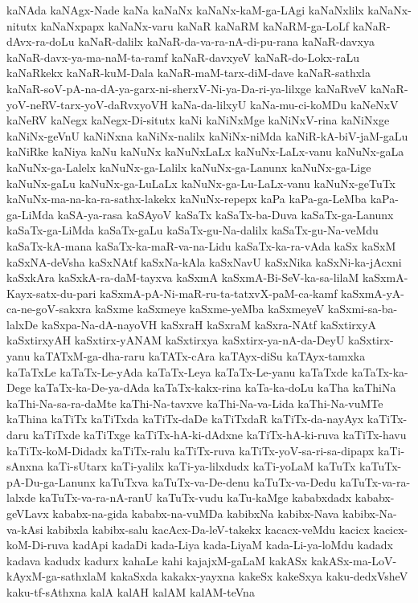 {kaNAda
kaNAgx-Nade
kaNa
kaNaNx
kaNaNx-kaM-ga-LAgi
kaNaNxlilx
kaNaNx-nitutx
kaNaNxpapx
kaNaNx-varu
kaNaR
kaNaRM
kaNaRM-ga-LoLf
kaNaR-dAvx-ra-doLu
kaNaR-dalilx
kaNaR-da-va-ra-nA-di-pu-rana
kaNaR-davxya
kaNaR-davx-ya-ma-naM-ta-ramf
kaNaR-davxyeV
kaNaR-do-Lokx-raLu
kaNaRkekx
kaNaR-kuM-Dala
kaNaR-maM-tarx-diM-dave
kaNaR-sathxla
kaNaR-soV-pA-na-dA-ya-garx-ni-sherxV-Ni-ya-Da-ri-ya-lilxge
kaNaRveV
kaNaR-yoV-neRV-tarx-yoV-daRvxyoVH
kaNa-da-lilxyU
kaNa-mu-ci-koMDu
kaNeNxV
kaNeRV
kaNegx
kaNegx-Di-situtx
kaNi
kaNiNxMge
kaNiNxV-rina
kaNiNxge
kaNiNx-geVnU
kaNiNxna
kaNiNx-nalilx
kaNiNx-niMda
kaNiR-kA-biV-jaM-gaLu
kaNiRke
kaNiya
kaNu
kaNuNx
kaNuNxLaLx
kaNuNx-LaLx-vanu
kaNuNx-gaLa
kaNuNx-ga-Lalelx
kaNuNx-ga-Lalilx
kaNuNx-ga-Lanunx
kaNuNx-ga-Lige
kaNuNx-gaLu
kaNuNx-ga-LuLaLx
kaNuNx-ga-Lu-LaLx-vanu
kaNuNx-geTuTx
kaNuNx-ma-na-ka-ra-sathx-lakekx
kaNuNx-repepx
kaPa
kaPa-ga-LeMba
kaPa-ga-LiMda
kaSA-ya-rasa
kaSAyoV
kaSaTx
kaSaTx-ba-Duva
kaSaTx-ga-Lanunx
kaSaTx-ga-LiMda
kaSaTx-gaLu
kaSaTx-gu-Na-dalilx
kaSaTx-gu-Na-veMdu
kaSaTx-kA-mana
kaSaTx-ka-maR-va-na-Lidu
kaSaTx-ka-ra-vAda
kaSx
kaSxM
kaSxNA-deVsha
kaSxNAtf
kaSxNa-kAla
kaSxNavU
kaSxNika
kaSxNi-ka-jAcxni
kaSxkAra
kaSxkA-ra-daM-tayxva
kaSxmA
kaSxmA-Bi-SeV-ka-sa-lilaM
kaSxmA-Kayx-satx-du-pari
kaSxmA-pA-Ni-maR-ru-ta-tatxvX-paM-ca-kamf
kaSxmA-yA-ca-ne-goV-sakxra
kaSxme
kaSxmeye
kaSxme-yeMba
kaSxmeyeV
kaSxmi-sa-ba-lalxDe
kaSxpa-Na-dA-nayoVH
kaSxraH
kaSxraM
kaSxra-NAtf
kaSxtirxyA
kaSxtirxyAH
kaSxtirx-yANAM
kaSxtirxya
kaSxtirx-ya-nA-da-DeyU
kaSxtirx-yanu
kaTATxM-ga-dha-raru
kaTATx-cAra
kaTAyx-diSu
kaTAyx-tamxka
kaTaTxLe
kaTaTx-Le-yAda
kaTaTx-Leya
kaTaTx-Le-yanu
kaTaTxde
kaTaTx-ka-Dege
kaTaTx-ka-De-ya-dAda
kaTaTx-kakx-rina
kaTa-ka-doLu
kaTha
kaThiNa
kaThi-Na-sa-ra-daMte
kaThi-Na-tavxve
kaThi-Na-va-Lida
kaThi-Na-vuMTe
kaThina
kaTiTx
kaTiTxda
kaTiTx-daDe
kaTiTxdaR
kaTiTx-da-nayAyx
kaTiTx-daru
kaTiTxde
kaTiTxge
kaTiTx-hA-ki-dAdxne
kaTiTx-hA-ki-ruva
kaTiTx-havu
kaTiTx-koM-Didadx
kaTiTx-ralu
kaTiTx-ruva
kaTiTx-yoV-sa-ri-sa-dipapx
kaTi-sAnxna
kaTi-sUtarx
kaTi-yalilx
kaTi-ya-lilxdudx
kaTi-yoLaM
kaTuTx
kaTuTx-pA-Du-ga-Lanunx
kaTuTxva
kaTuTx-va-De-denu
kaTuTx-va-Dedu
kaTuTx-va-ra-lalxde
kaTuTx-va-ra-nA-ranU
kaTuTx-vudu
kaTu-kaMge
kababxdadx
kababx-geVLavx
kababx-na-gida
kababx-na-vuMDa
kabibxNa
kabibx-Nava
kabibx-Na-va-kAsi
kabibxla
kabibx-salu
kacAcx-Da-leV-takekx
kacacx-veMdu
kacicx
kacicx-koM-Di-ruva
kadApi
kadaDi
kada-Liya
kada-LiyaM
kada-Li-ya-loMdu
kadadx
kadava
kadudx
kadurx
kahaLe
kahi
kajajxM-gaLaM
kakASx
kakASx-ma-LoV-kAyxM-ga-sathxlaM
kakaSxda
kakakx-yayxna
kakeSx
kakeSxya
kaku-dedxVsheV
kaku-tf-sAthxna
kalA
kalAH
kalAM
kalAM-teVna
}
